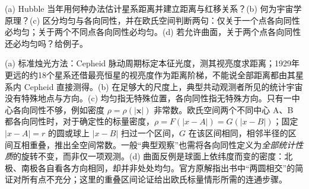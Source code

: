 \begin{exercise}
(a) Hubble 当年用何种办法估计星系距离并建立距离与红移关系？(b) 何为宇宙学原理？(c) 区分均匀与各向同性，并在欧氏空间判断两句：仅关于一个点各向同性必均匀；关于两个不同点各向同性必均匀。(d) 若允许曲面，关于两个点各向同性还必均匀吗？给例子。
\end{exercise}
\begin{solution}
(a) 标准烛光方法：Cepheid 脉动周期标定本征光度，测其视亮度求距离；1929年更远的约18个星系还借最亮恒星的视亮度作为距离阶梯，不能说全部距离都由其星系内 Cepheid 直接测得。(b) 在足够大的尺度上，典型共动观测者所见的统计宇宙没有特殊地点与方向。(c) 均匀指无特殊位置，各向同性指无特殊方向。只有一中心各向同性不够，例如密度 $\rho=\rho(|\boldsymbol x|)$ 非常数。欧氏空间两个不同中心 A、B 都各向同性时，对于确定性的标量密度，$\rho=F(|x-A|)=G(|x-B|)$；固定 $|x-A|=r$ 的圆或球上 $|x-B|$ 扫过一个区间，$G$ 在该区间相同，相邻半径的区间互相重叠，推出全空间常数。一般“典型观察”也需将各向同性定义为\emph{全部统计性质}的旋转不变，而非仅一项观测。(d) 曲面反例是球面上依纬度而变的密度：北极、南极各自看各方向相同，却并非处处均匀。官方原解指出书中“两圆相交”的简证对所有点不充分；这里的重叠区间论证给出欧氏标量情形所需的连通步骤。
\end{solution}
